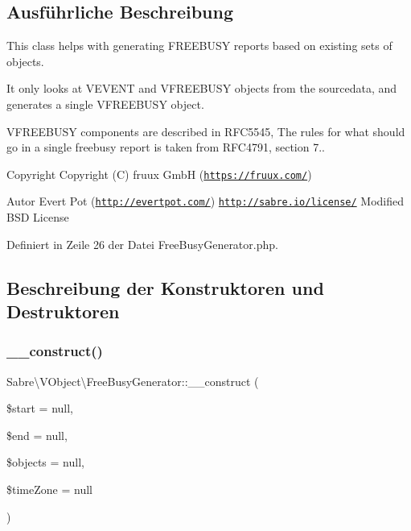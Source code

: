 \subsection{Ausführliche Beschreibung}
This class helps with generating F\+R\+E\+E\+B\+U\+SY reports based on existing sets of objects.

It only looks at V\+E\+V\+E\+NT and V\+F\+R\+E\+E\+B\+U\+SY objects from the sourcedata, and generates a single V\+F\+R\+E\+E\+B\+U\+SY object.

V\+F\+R\+E\+E\+B\+U\+SY components are described in R\+F\+C5545, The rules for what should go in a single freebusy report is taken from R\+F\+C4791, section 7..

\begin{DoxyCopyright}{Copyright}
Copyright (C) fruux GmbH (\href{https://fruux.com/}{\tt https\+://fruux.\+com/}) 
\end{DoxyCopyright}
\begin{DoxyAuthor}{Autor}
Evert Pot (\href{http://evertpot.com/}{\tt http\+://evertpot.\+com/})  \href{http://sabre.io/license/}{\tt http\+://sabre.\+io/license/} Modified B\+SD License 
\end{DoxyAuthor}


Definiert in Zeile 26 der Datei Free\+Busy\+Generator.\+php.



\subsection{Beschreibung der Konstruktoren und Destruktoren}
\mbox{\label{class_sabre_1_1_v_object_1_1_free_busy_generator_aabe9ecba310f075be685069d95d7eb2e}} 
\subsubsection{\texorpdfstring{\+\_\+\+\_\+construct()}{\_\_construct()}}
{\footnotesize\ttfamily Sabre\textbackslash{}\+V\+Object\textbackslash{}\+Free\+Busy\+Generator\+::\+\_\+\+\_\+construct (\begin{DoxyParamCaption}\item[{Date\+Time\+Interface}]{\$start = {\ttfamily null},  }\item[{Date\+Time\+Interface}]{\$end = {\ttfamily null},  }\item[{}]{\$objects = {\ttfamily null},  }\item[{Date\+Time\+Zone}]{\$time\+Zone = {\ttfamily null} }\end{DoxyParamCaption})}


